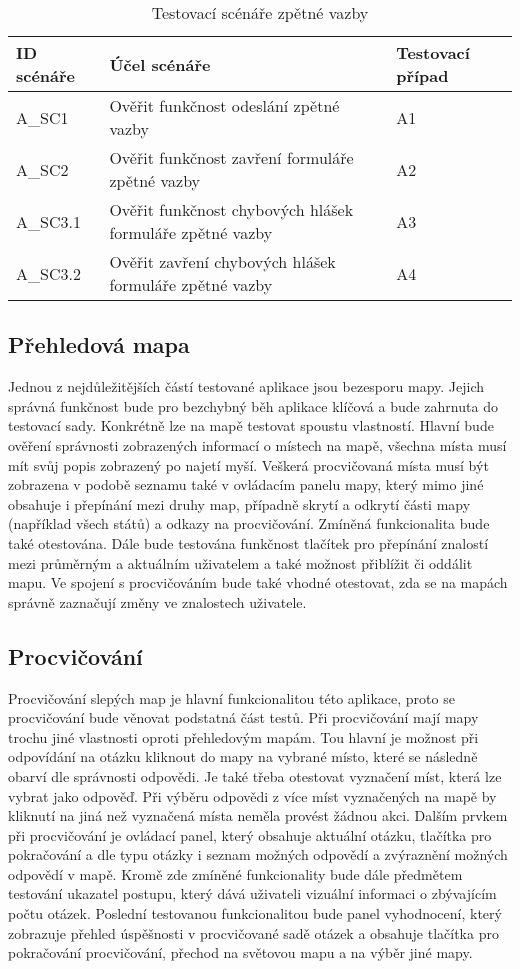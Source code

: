 \documentclass[
    color,   %
	table,   %
    twoside, %
]{fithesis3}
\begin{document}
\begin{table}[h]
\begin{tabular}{ | L{2cm} | L{7cm} | L{2cm}}
\hline
	ID scénáře & Účel scénáře & Testovací případ \\ \hline
	A\_SC1 & Ověřit funkčnost odeslání zpětné vazby & A1 \\ \hline
	A\_SC2 & Ověřit funkčnost zavření formuláře zpětné vazby & A2 \\ \hline
	A\_SC3.1 & Ověřit funkčnost chybových hlášek formuláře zpětné vazby & A3 \\ \hline
	A\_SC3.2 & Ověřit zavření chybových hlášek formuláře zpětné vazby & A4 \\ \hline
\end{tabular}
\caption{Testovací scénáře zpětné vazby}
\end{table}

\subsection{Přehledová mapa}
Jednou z nejdůležitějších částí testované aplikace jsou bezesporu mapy. Jejich správná funkčnost bude pro bezchybný běh aplikace klíčová a bude zahrnuta do testovací sady. Konkrétně lze na mapě testovat spoustu vlastností. Hlavní bude ověření správnosti zobrazených informací o místech na mapě, všechna místa musí mít svůj popis zobrazený po najetí myší. Veškerá procvičovaná místa musí být zobrazena v podobě seznamu také v ovládacím panelu mapy, který mimo jiné obsahuje i přepínání mezi druhy map, případně skrytí a odkrytí části mapy (například všech států) a odkazy na procvičování. Zmíněná funkcionalita bude také otestována. Dále bude testována funkčnost tlačítek pro přepínání znalostí mezi průměrným a aktuálním uživatelem a také možnost přiblížit či oddálit mapu. Ve spojení s procvičováním bude také vhodné otestovat, zda se na mapách správně zaznačují změny ve znalostech uživatele.

\subsection{Procvičování}
Procvičování slepých map je hlavní funkcionalitou této aplikace, proto se procvičování bude věnovat podstatná část testů. Při procvičování mají mapy trochu jiné vlastnosti oproti přehledovým mapám. Tou hlavní je možnost při odpovídání na otázku kliknout do mapy na vybrané místo, které se následně obarví dle správnosti odpovědi. Je také třeba otestovat vyznačení míst, která lze vybrat jako odpověď. Při výběru odpovědi z více míst vyznačených na mapě by kliknutí na jiná než vyznačená místa neměla provést žádnou akci. Dalším prvkem při procvičování je ovládací panel, který obsahuje aktuální otázku, tlačítka pro pokračování a dle typu otázky i seznam možných odpovědí a zvýraznění možných odpovědí v mapě. Kromě zde zmíněné funkcionality bude dále předmětem testování ukazatel postupu, který dává uživateli vizuální informaci o zbývajícím počtu otázek. Poslední testovanou funkcionalitou bude panel vyhodnocení, který zobrazuje přehled úspěšnosti v procvičované sadě otázek a obsahuje tlačítka pro pokračování procvičování, přechod na světovou mapu a na výběr jiné mapy.
\end{document}
